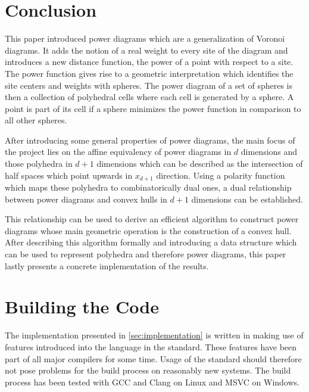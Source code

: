\section{Conclusion}
\label{sec:conclusion}
This paper introduced power diagrams which are a generalization of Voronoi diagrams.
It adds the notion of a real weight to every site of the diagram and introduces a new distance function, the power of a point with respect to a site.
The power function gives rise to a geometric interpretation which identifies the site centers and weights with spheres.
The power diagram of a set of spheres is then a collection of polyhedral cells where each cell is generated by a sphere.
A point is part of its cell if a sphere minimizes the power function in comparison to all other spheres.

After introducing some general properties of power diagrams, the main focus of the project lies on the affine equivalency of power diagrams in $d$ dimensions and those polyhedra in $d+1$ dimensions which can be described as the intersection of half spaces which point upwards in $x_{d+1}$ direction.
Using a polarity function which maps these polyhedra to combinatorically dual ones, a dual relationship between power diagrams and convex hulls in $d+1$ dimensions can be established.

This relationship can be used to derive an efficient algorithm to construct power diagrams whose main geometric operation is the construction of a convex hull.
After describing this algorithm formally and introducing a data structure which can be used to represent polyhedra and therefore power diagrams, this paper lastly presents a concrete implementation of the results.

\appendix
\newpage %
\section{Building the Code}
\label{sec:building_the_code}
The implementation presented in \cref{sec:implementation} is written in \CC making use of features introduced into the language in the \CCe standard.
These features have been part of all major \CC compilers for some time.
Usage of the standard should therefore not pose problems for the build process on reasonably new systems.
The build process has been tested with GCC and Clang on Linux and MSVC on Windows.

